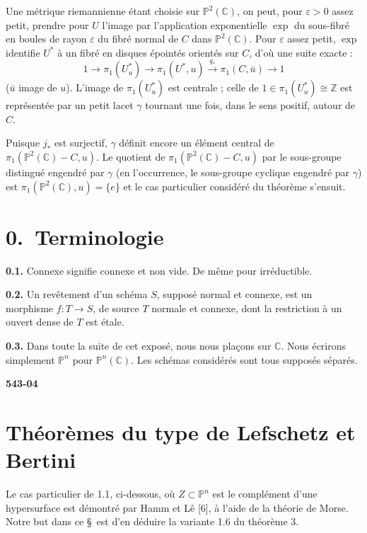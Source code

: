 \documentclass[12pt,a4paper]{article}
\newcounter{secitem}
\begin{document}
Une métrique riemannienne étant choisie sur $\mathbb{P}^2(\mathbb{C})$, on peut, pour $\varepsilon > 0$ assez petit, prendre pour $U$ l'image par l'application exponentielle $\exp$ du sous-fibré en boules de rayon $\varepsilon$ du fibré normal de $C$ dans $\mathbb{P}^2(\mathbb{C})$. Pour $\varepsilon$ assez petit, $\exp$ identifie $U^*$ à un fibré en disques épointés orientés sur $C$, d'où une suite exacte :
\[
1 \longrightarrow \pi_1(U^*_u) \longrightarrow \pi_1(U^*, u) \xrightarrow{\;q_*\;} \pi_1(C, \bar{u}) \longrightarrow 1
\]
($\bar{u}$ image de $u$). L'image de $\pi_1(U^*_u)$ est centrale ; celle de $1 \in \pi_1(U^*_u) \cong \mathbb{Z}$ est représentée par un petit lacet $\gamma$ tournant une fois, dans le sens positif, autour de $C$.

Puisque $j_*$ est surjectif, $\gamma$ définit encore un élément central de $\pi_1(\mathbb{P}^2(\mathbb{C}) - C, u)$. Le quotient de $\pi_1(\mathbb{P}^2(\mathbb{C}) - C, u)$ par le sous-groupe distingué engendré par $\gamma$ (en l'occurrence, le sous-groupe cyclique engendré par $\gamma$) est $\pi_1(\mathbb{P}^2(\mathbb{C}), u) = \{e\}$ et le cas particulier considéré du théorème s'ensuit.

\section*{0.\ Terminologie}

\textbf{0.1.} Connexe signifie connexe et non vide. De même pour irréductible.

\textbf{0.2.} Un revêtement d'un schéma $S$, supposé normal et connexe, est un morphisme $f : T \to S$, de source $T$ normale et connexe, dont la restriction à un ouvert dense de $T$ est étale.

\textbf{0.3.} Dans toute la suite de cet exposé, nous nous plaçons sur $\mathbb{C}$. Nous écrirons simplement $\mathbb{P}^n$ pour $\mathbb{P}^n(\mathbb{C})$. Les schémas considérés sont tous supposés séparés.

\newpage
\begin{flushright}
\textbf{543-04}
\end{flushright}

\section{Théorèmes du type de Lefschetz et Bertini}
\setcounter{secitem}{0}

Le cas particulier de 1.1, ci-dessous, où $Z \subset \mathbb{P}^n$ est le complément d'une hypersurface est démontré par Hamm et Lê [6], à l'aide de la théorie de Morse. Notre but dans ce \S\ est d'en déduire la variante 1.6 du théorème 3.
\end{document}
